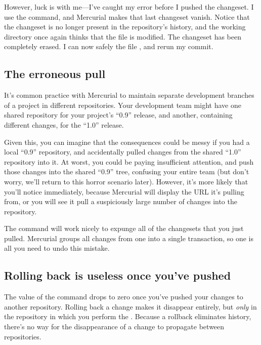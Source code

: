 However, luck is with me---I've caught my error before I pushed the
changeset.  I use the  command, and Mercurial makes
that last changeset vanish.
Notice that the changeset is no longer present in the repository's
history, and the working directory once again thinks that the file
 is modified.  The changeset has been completely erased.
I can now safely  the file , and rerun my
commit.

\subsection{The erroneous pull}

It's common practice with Mercurial to maintain separate development
branches of a project in different repositories.  Your development
team might have one shared repository for your project's ``0.9''
release, and another, containing different changes, for the ``1.0''
release.

Given this, you can imagine that the consequences could be messy if
you had a local ``0.9'' repository, and accidentally pulled changes
from the shared ``1.0'' repository into it.  At worst, you could be
paying insufficient attention, and push those changes into the shared
``0.9'' tree, confusing your entire team (but don't worry, we'll
return to this horror scenario later).  However, it's more likely that
you'll notice immediately, because Mercurial will display the URL it's
pulling from, or you will see it pull a suspiciously large number of
changes into the repository.

The  command will work nicely to expunge all of the
changesets that you just pulled.  Mercurial groups all changes from
one  into a single transaction, so one  is
all you need to undo this mistake.

\subsection{Rolling back is useless once you've pushed}

The value of the  command drops to zero once you've
pushed your changes to another repository.  Rolling back a change
makes it disappear entirely, but \emph{only} in the repository in
which you perform the .  Because a rollback eliminates
history, there's no way for the disappearance of a change to propagate
between repositories.

